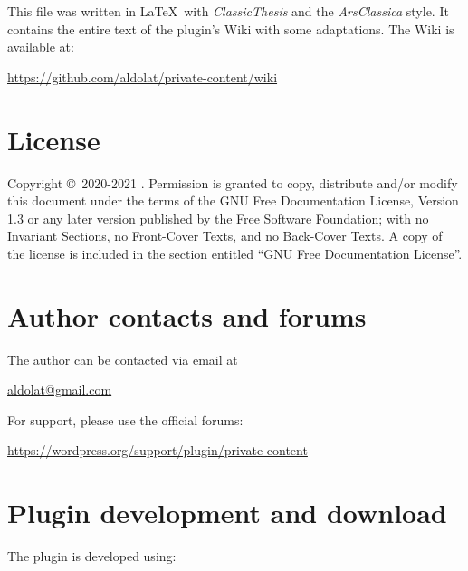 \begingroup
	\footnotesize

	\noindent This file was written in \LaTeX~with \emph{ClassicThesis} and the
	\emph{ArsClassica} style. It contains the entire text of the plugin's Wiki
	with some adaptations. The Wiki is available at:

	\begin{center}
		\url{https://github.com/aldolat/private-content/wiki}
	\end{center}

	\vfill

	\section*{License}

	Copyright \copyright~2020-2021 \myName.\newline
    \noindent Permission is granted to copy, distribute and/or modify this
    document under the terms of the GNU Free Documentation License, Version 1.3
    or any later version published by the Free Software Foundation; with no
    Invariant Sections, no Front-Cover Texts, and no Back-Cover Texts. A copy of
    the license is included in the section entitled ``GNU Free Documentation
	License''.

	\section*{Author contacts and forums}

	\noindent The author can be contacted via email at
	\begin{center}
		\href{mailto:aldolat@gmail.com}{aldolat@gmail.com}
	\end{center}
	For support, please use the official forums:
	\begin{center}
	\url{https://wordpress.org/support/plugin/private-content}
	\end{center}
\endgroup

\newpage

\begingroup

	\footnotesize

	\section*{Plugin development and download}

	\noindent The plugin is developed using:

